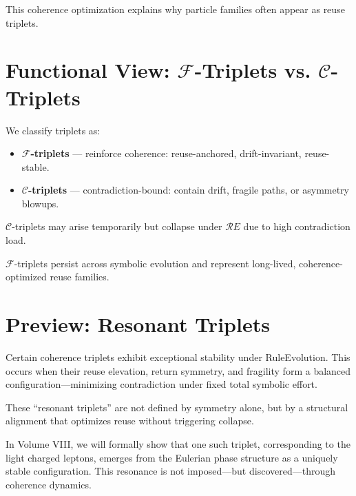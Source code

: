 This coherence optimization explains why particle families often appear as reuse triplets.

\section{Functional View: $\mathcal{F}$-Triplets vs. $\mathcal{C}$-Triplets} \label{sec:triplet-functional-classes}

We classify triplets as:

\begin{itemize}
    \item \textbf{$\mathcal{F}$-triplets} — reinforce coherence: reuse-anchored, drift-invariant, reuse-stable.
    \item \textbf{$\mathcal{C}$-triplets} — contradiction-bound: contain drift, fragile paths, or asymmetry blowups.
\end{itemize}

$\mathcal{C}$-triplets may arise temporarily but collapse under $\mathcal{R}E$ due to high contradiction load.

$\mathcal{F}$-triplets persist across symbolic evolution and represent long-lived, coherence-optimized reuse families.

\section{Preview: Resonant Triplets} \label{sec:triplet-preview}

Certain coherence triplets exhibit exceptional stability under RuleEvolution. This occurs when their reuse elevation, return symmetry, and fragility form a balanced configuration—minimizing contradiction under fixed total symbolic effort.

These “resonant triplets” are not defined by symmetry alone, but by a structural alignment that optimizes reuse without triggering collapse.

In Volume VIII, we will formally show that one such triplet, corresponding to the light charged leptons, emerges from the Eulerian phase structure as a uniquely stable configuration. This resonance is not imposed—but discovered—through coherence dynamics.
